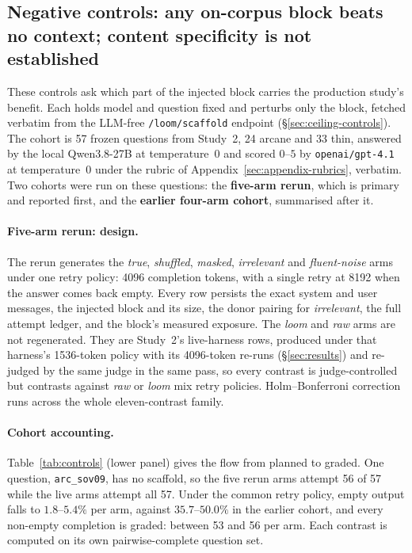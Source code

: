 \documentclass[10pt,twocolumn]{article}
\begin{document}
\subsection{Negative controls: any on-corpus block beats no context; content specificity is not established}\label{sec:controls}
These controls ask which part of the injected block carries the production study's benefit. Each holds model and question fixed and perturbs only the block, fetched verbatim from the LLM-free \texttt{/loom/scaffold} endpoint (\S\ref{sec:ceiling-controls}). The cohort is 57 frozen questions from Study~2, 24 arcane and 33 thin, answered by the local Qwen3.8-27B at temperature~0 and scored $0$--$5$ by \texttt{openai/gpt-4.1} at temperature~0 under the rubric of Appendix~\ref{sec:appendix-rubrics}, verbatim. Two cohorts were run on these questions: the \textbf{five-arm rerun}, which is primary and reported first, and the \textbf{earlier four-arm cohort}, summarised after it.

\paragraph{Five-arm rerun: design.} The rerun generates the \emph{true}, \emph{shuffled}, \emph{masked}, \emph{irrelevant} and \emph{fluent-noise} arms under one retry policy: 4096 completion tokens, with a single retry at 8192 when the answer comes back empty. Every row persists the exact system and user messages, the injected block and its size, the donor pairing for \emph{irrelevant}, the full attempt ledger, and the block's measured exposure. The \emph{loom} and \emph{raw} arms are not regenerated. They are Study~2's live-harness rows, produced under that harness's 1536-token policy with its 4096-token re-runs (\S\ref{sec:results}) and re-judged by the same judge in the same pass, so every contrast is judge-controlled but contrasts against \emph{raw} or \emph{loom} mix retry policies. Holm--Bonferroni correction runs across the whole eleven-contrast family.

\paragraph{Cohort accounting.} Table~\ref{tab:controls} (lower panel) gives the flow from planned to graded. One question, \texttt{arc\_sov09}, has no scaffold, so the five rerun arms attempt 56 of 57 while the live arms attempt all 57. Under the common retry policy, empty output falls to $1.8$--$5.4\%$ per arm, against $35.7$--$50.0\%$ in the earlier cohort, and every non-empty completion is graded: between 53 and 56 per arm. Each contrast is computed on its own pairwise-complete question set.
\end{document}
